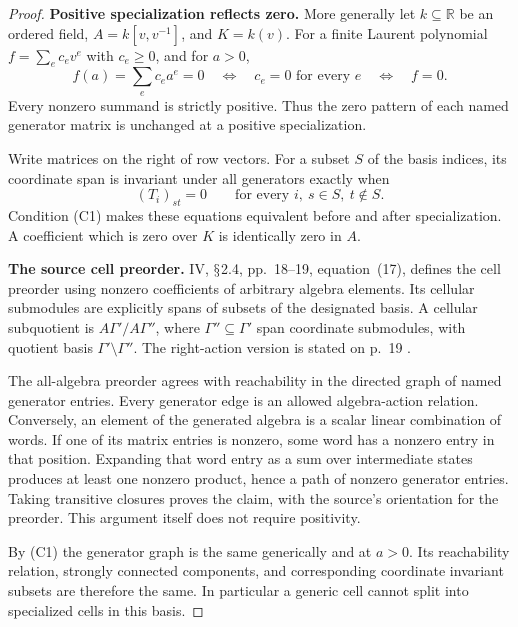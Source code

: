 \documentclass[11pt,a4paper]{article}
\renewcommand{\S}{\ensuremath{\mathsection}}
\theoremstyle{named}\newtheorem{finding}{Finding}[section]
\theoremstyle{definition}\newtheorem{definition}[finding]{Definition}
\theoremstyle{remark}\newtheorem{remark}[finding]{Remark}
\begin{document}
\begin{proof}
\par\smallskip\noindent\textbf{Positive specialization reflects zero.}\quad
More generally let \(k\subseteq\mathbb R\) be an ordered field,
\(A=k[v,v^{-1}]\), and \(K=k(v)\).
For a finite Laurent polynomial
\(f=\sum_e c_ev^e\) with \(c_e\ge0\), and for \(a>0\),
\[
f(a)=\sum_e c_ea^e=0
\quad\Longleftrightarrow\quad
c_e=0\text{ for every }e
\quad\Longleftrightarrow\quad
f=0.
\tag{C1}
\]
Every nonzero summand is strictly positive.
Thus the zero pattern of each named generator matrix is
unchanged at a positive specialization.

Write matrices on the right of row vectors.
For a subset \(S\) of the basis indices, its coordinate span
is invariant under all generators exactly when
\[
(T_i)_{st}=0
\qquad
\text{for every }i,\ s\in S,\ t\notin S.
\tag{C2}
\]
Condition (C1) makes these equations equivalent before and
after specialization. A coefficient which is zero over \(K\)
is identically zero in \(A\).

\par\smallskip\noindent\textbf{The source cell preorder.}\quad
IV, \S2.4, pp.~18--19, equation~(17), defines the cell preorder
using nonzero coefficients of arbitrary algebra elements.
Its cellular submodules are explicitly spans of subsets
of the designated basis. A cellular subquotient is
\(A\Gamma'/A\Gamma''\), where
\(\Gamma''\subseteq\Gamma'\) span coordinate submodules,
with quotient basis \(\Gamma'\setminus\Gamma''\).
The right-action version is stated on p.~19 \cite{IV}.

The all-algebra preorder agrees with reachability in the
directed graph of named generator entries.
Every generator edge is an allowed algebra-action relation.
Conversely, an element of the generated algebra is a scalar
linear combination of words. If one of its matrix entries is
nonzero, some word has a nonzero entry in that position.
Expanding that word entry as a sum over intermediate states
produces at least one nonzero product, hence a path of nonzero
generator entries. Taking transitive closures proves the
claim, with the source's orientation for the preorder.
This argument itself does not require positivity.

By (C1) the generator graph is the same generically and at
\(a>0\). Its reachability relation, strongly connected
components, and corresponding coordinate invariant subsets
are therefore the same. In particular a generic cell cannot
split into specialized cells in this basis.


\end{proof}
\end{document}
